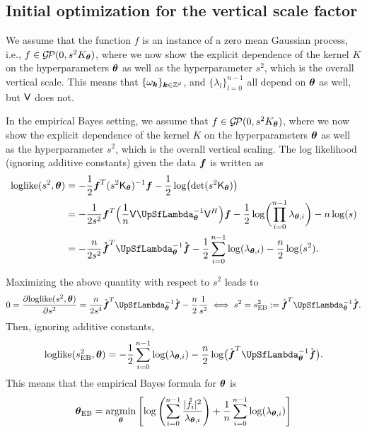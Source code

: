 \documentclass{amsart}
\newcommand{\rvf}{\mathring{\vf}}
\newcommand{\gp}{\mathcal{G}\!\mathcal{P}}
\begin{document}
\subsection{Initial optimization for the vertical scale factor}
We assume that the function $f$ is an instance of a zero mean Gaussian process, i.e., $f \in \gp(0,s^2K_{\vtheta})$, where we now show the explicit dependence of the
kernel $K$ on the hyperparameters $\boldsymbol{\theta}$ as well as the hyperparameter $s^2$, which is the overall vertical scale.
This means that $\{\omega_{\boldsymbol{k}}\}_{\boldsymbol{k} \in \mathbb{Z}^d}$, and $\{\lambda_l \}_{l=0}^{n-1}$ all depend on $\boldsymbol{\theta}$ as well, but $\mathsf{V}$ does not.

In the empirical Bayes setting, we assume that $f \in \gp(0,s^2K_{\vtheta})$, where we now show the explicit dependence of the
kernel $K$ on the hyperparameters $\boldsymbol{\theta}$ as well as the hyperparameter $s^2$, which is the overall vertical scaling.  
The log likelihood (ignoring additive constants) given the data $\boldsymbol{f}$ is written as 
\begin{align}
	\text{loglike}(s^2,\vtheta) 
	& = - \frac 1{2} \vf^T (s^2\mK_{\vtheta})^{-1}\vf - \frac 12 \log\bigl(\det(s^2 \mK_{\vtheta})\bigr)  \\
	\nonumber 
	& = - \frac 1{2 s^2} \vf^T\Bigl(\frac 1n \mV \mLambda_{\vtheta}^{-1} \mV^H \Bigr)\vf 
	- \frac 12 \log\biggl(\prod_{i=0}^{n-1} \lambda_{\vtheta,i}\biggr) - n \log(s)  \\
	\nonumber 
	& = - \frac n{2 s^2} \rvf^T\mLambda_{\vtheta}^{-1} \rvf 
- \frac 12 \sum_{i=0}^{n-1} \log(\lambda_{\vtheta,i}) - \frac{n}2 \log(s^2).
\end{align}

Maximizing the above quantity with respect to $s^2$ leads to 
\begin{equation*}
    0  =\frac{\partial \text{loglike}(s^2,\vtheta)}{\partial s^2}
    = \frac n{2 s^4} \rvf^T\mLambda_{\vtheta}^{-1} \rvf 
 - \frac{n}2 \frac {1}{s^2}
 \iff s^2 = s_{\text{EB}}^2 := \rvf^T\mLambda_{\vtheta}^{-1} \rvf .
\end{equation*}
Then, ignoring additive constants,
\begin{equation*}
    \text{loglike}(s_{\text{EB}}^2,\vtheta) 
	= 
- \frac 12 \sum_{i=0}^{n-1} \log(\lambda_{\vtheta,i}) - \frac n2 \log\bigl(\rvf^T\mLambda_{\vtheta}^{-1} \rvf \bigr).
\end{equation*}
This means that the empirical Bayes formula for $\boldsymbol{\theta}$ is
\begin{equation}
    \boldsymbol{\theta}_{\text{EB}} 
    = \operatorname*{argmin}_{\boldsymbol{\theta}} \left [\log\left( \sum_{i=0}^{n-1} \frac{\lvert\mathring{f}_i\rvert^2}{\lambda_{\boldsymbol{\theta},i}} \right)
    + \frac 1n \sum_{i=0}^{n-1} \log(\lambda_{\boldsymbol{\theta},i} ) \right ]
\end{equation}
\end{document}
